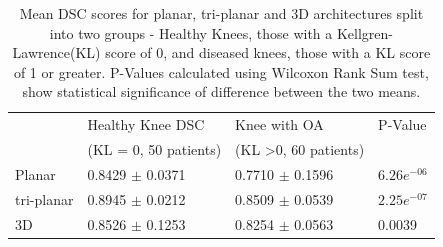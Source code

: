 \documentclass[11pt,a4paper]{memoir}
\numberwithin{figure}{section}
\numberwithin{table}{section}
\numberwithin{equation}{section}
\begin{document}
\begin{table}[!h]

\centering
\caption[DSC scores for healthy knees compared to diseased knees]{Mean DSC scores for planar, tri-planar and 3D architectures split into two groups - Healthy Knees, those with a Kellgren-Lawrence(KL) score of 0, and diseased knees, those with a KL score of 1 or greater. P-Values calculated using Wilcoxon Rank Sum test, show statistical significance of difference between the two means. }
\begin{tabular}{|l|l|l|l|}
\hline
 & Healthy Knee DSC      & Knee with OA & P-Value         \\ 
 & (KL = 0, 50 patients) & (KL \textgreater 0, 60 patients) & \\ \hline
Planar                   & 0.8429 $\pm$ 0.0371                  & 0.7710 $\pm$ 0.1596                             & $6.26e^{-06}$         \\ \hline
tri-planar                & 0.8945 $\pm$ 0.0212                  & 0.8509 $\pm$ 0.0539                             & $2.25e^{-07}$ \\ \hline
3D                       & 0.8526 $\pm$ 0.1253                  & 0.8254 $\pm$ 0.0563                             & 0.0039         \\ \hline
\end{tabular}

\label{table:KL}
\end{table}
\end{document}
